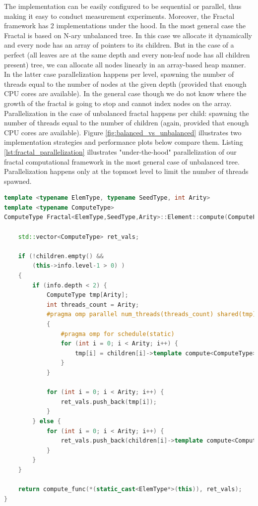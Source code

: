 \quad The implementation can be easily configured to be sequential or parallel, thus making it easy to conduct measurement experiments. Moreover, the Fractal framework has 2 implementations under the hood. In the most general case the Fractal is based on N-ary unbalanced tree. In this case we allocate it dynamically and every node has an array of pointers to its children. But in the case of a perfect (all leaves are at the same depth and every non-leaf node has all children present) tree, we can allocate all nodes linearly in an array-based heap manner. In the latter case parallelization happens per level, spawning the number of threads equal to the number of nodes at the given depth (provided that enough CPU cores are available). In the general case though we do not know where the growth of the fractal is going to stop and cannot index nodes on the array. Parallelization in the case of unbalanced fractal happens per child: spawning the number of threads equal to the number of children (again, provided that enough CPU cores are available). Figure \ref{fig:balanced_vs_unbalanced} illustrates two implementation strategies and performance plots below compare them. Listing \ref{lst:fractal_parallelization} illustrates "under-the-hood" parallelization of our fractal computational framework in the most general case of unbalanced tree. Parallelization happens only at the topmost level to limit the number of threads spawned.
\begin{lstlisting}[caption={The "under-the-hood" parallelization of unbalanced Fractal computational framework},label={lst:fractal_parallelization},language=C++]
template <typename ElemType, typename SeedType, int Arity>
template <typename ComputeType>
ComputeType Fractal<ElemType,SeedType,Arity>::Element::compute(ComputeFunction<ComputeType>& compute_func) {
    
    std::vector<ComputeType> ret_vals;
    
    if (!children.empty() && 
        (this->info.level-1 > 0) )
    { 
        if (info.depth < 2) {
            ComputeType tmp[Arity];
            int threads_count = Arity;
            #pragma omp parallel num_threads(threads_count) shared(tmp)
            {
                #pragma omp for schedule(static)
                for (int i = 0; i < Arity; i++) {
                    tmp[i] = children[i]->template compute<ComputeType>(compute_func);
                }
            }

            for (int i = 0; i < Arity; i++) {
                ret_vals.push_back(tmp[i]);
            }
        } else {
            for (int i = 0; i < Arity; i++) {
                ret_vals.push_back(children[i]->template compute<ComputeType>(compute_func));
            }
        }
    }
   
    return compute_func(*(static_cast<ElemType*>(this)), ret_vals);
}
\end{lstlisting}
